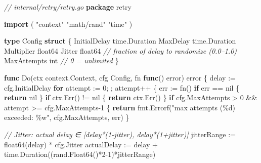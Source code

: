 \documentclass[
]{article}
\newenvironment{Shaded}{}{}
\newcommand{\CommentTok}[1]{\textcolor[rgb]{0.38,0.63,0.69}{\textit{#1}}}
\newcommand{\ControlFlowTok}[1]{\textcolor[rgb]{0.00,0.44,0.13}{\textbf{#1}}}
\newcommand{\DataTypeTok}[1]{\textcolor[rgb]{0.56,0.13,0.00}{#1}}
\newcommand{\DecValTok}[1]{\textcolor[rgb]{0.25,0.63,0.44}{#1}}
\newcommand{\KeywordTok}[1]{\textcolor[rgb]{0.00,0.44,0.13}{\textbf{#1}}}
\newcommand{\NormalTok}[1]{#1}
\newcommand{\OperatorTok}[1]{\textcolor[rgb]{0.40,0.40,0.40}{#1}}
\newcommand{\OtherTok}[1]{\textcolor[rgb]{0.00,0.44,0.13}{#1}}
\newcommand{\StringTok}[1]{\textcolor[rgb]{0.25,0.44,0.63}{#1}}
\begin{document}
\begin{Shaded}
\begin{Highlighting}[]
\CommentTok{// internal/retry/retry.go}
\KeywordTok{package}\NormalTok{ retry}

\KeywordTok{import} \OperatorTok{(}
    \StringTok{"context"}
    \StringTok{"math/rand"}
    \StringTok{"time"}
\OperatorTok{)}

\KeywordTok{type}\NormalTok{ Config }\KeywordTok{struct} \OperatorTok{\{}
\NormalTok{    InitialDelay time}\OperatorTok{.}\NormalTok{Duration}
\NormalTok{    MaxDelay     time}\OperatorTok{.}\NormalTok{Duration}
\NormalTok{    Multiplier   }\DataTypeTok{float64}
\NormalTok{    Jitter       }\DataTypeTok{float64} \CommentTok{// fraction of delay to randomize (0.0–1.0)}
\NormalTok{    MaxAttempts  }\DataTypeTok{int}     \CommentTok{// 0 = unlimited}
\OperatorTok{\}}

\KeywordTok{func}\NormalTok{ Do}\OperatorTok{(}\NormalTok{ctx context}\OperatorTok{.}\NormalTok{Context}\OperatorTok{,}\NormalTok{ cfg Config}\OperatorTok{,}\NormalTok{ fn }\KeywordTok{func}\OperatorTok{()} \DataTypeTok{error}\OperatorTok{)} \DataTypeTok{error} \OperatorTok{\{}
\NormalTok{    delay }\OperatorTok{:=}\NormalTok{ cfg}\OperatorTok{.}\NormalTok{InitialDelay}
    \ControlFlowTok{for}\NormalTok{ attempt }\OperatorTok{:=} \DecValTok{0}\OperatorTok{;} \OperatorTok{;}\NormalTok{ attempt}\OperatorTok{++} \OperatorTok{\{}
\NormalTok{        err }\OperatorTok{:=}\NormalTok{ fn}\OperatorTok{()}
        \ControlFlowTok{if}\NormalTok{ err }\OperatorTok{==} \OtherTok{nil} \OperatorTok{\{}
            \ControlFlowTok{return} \OtherTok{nil}
        \OperatorTok{\}}
        \ControlFlowTok{if}\NormalTok{ ctx}\OperatorTok{.}\NormalTok{Err}\OperatorTok{()} \OperatorTok{!=} \OtherTok{nil} \OperatorTok{\{}
            \ControlFlowTok{return}\NormalTok{ ctx}\OperatorTok{.}\NormalTok{Err}\OperatorTok{()}
        \OperatorTok{\}}
        \ControlFlowTok{if}\NormalTok{ cfg}\OperatorTok{.}\NormalTok{MaxAttempts }\OperatorTok{\textgreater{}} \DecValTok{0} \OperatorTok{\&\&}\NormalTok{ attempt }\OperatorTok{\textgreater{}=}\NormalTok{ cfg}\OperatorTok{.}\NormalTok{MaxAttempts}\DecValTok{{-}1} \OperatorTok{\{}
            \ControlFlowTok{return}\NormalTok{ fmt}\OperatorTok{.}\NormalTok{Errorf}\OperatorTok{(}\StringTok{"max attempts (\%d) exceeded: \%w"}\OperatorTok{,}\NormalTok{ cfg}\OperatorTok{.}\NormalTok{MaxAttempts}\OperatorTok{,}\NormalTok{ err}\OperatorTok{)}
        \OperatorTok{\}}

        \CommentTok{// Jitter: actual delay ∈ [delay*(1{-}jitter), delay*(1+jitter)]}
\NormalTok{        jitterRange }\OperatorTok{:=} \DataTypeTok{float64}\OperatorTok{(}\NormalTok{delay}\OperatorTok{)} \OperatorTok{*}\NormalTok{ cfg}\OperatorTok{.}\NormalTok{Jitter}
\NormalTok{        actualDelay }\OperatorTok{:=}\NormalTok{ delay }\OperatorTok{+}\NormalTok{ time}\OperatorTok{.}\NormalTok{Duration}\OperatorTok{((}\NormalTok{rand}\OperatorTok{.}\NormalTok{Float64}\OperatorTok{()*}\DecValTok{2{-}1}\OperatorTok{)*}\NormalTok{jitterRange}\OperatorTok{)}


\end{Highlighting}
\end{Shaded}
\end{document}
